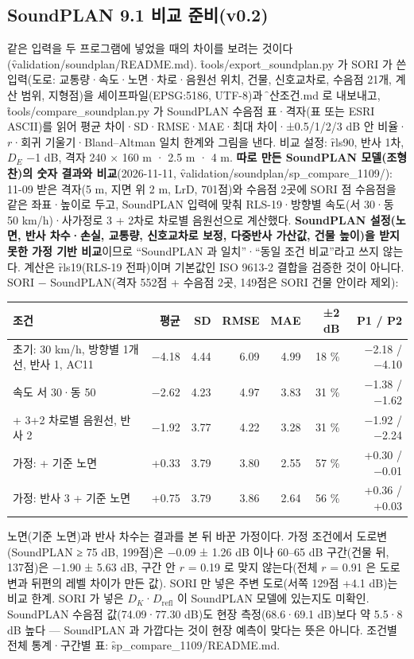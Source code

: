 \documentclass[10.5pt,a4paper]{article}
\begin{document}
\subsection{SoundPLAN 9.1 비교 준비(v0.2)}
같은 입력을 두 프로그램에 넣었을 때의 차이를 보려는 것이다(\f{validation/soundplan/README.md}). \f{tools/export\_soundplan.py} 가 SORI 가 쓴 입력(도로: 교통량·속도·노면·차로·음원선 위치, 건물, 신호교차로, 수음점 21개, 계산 범위, 지형점)을 셰이프파일(EPSG:5186, UTF-8)과 \f{계산조건.md} 로 내보내고, \f{tools/compare\_soundplan.py} 가 SoundPLAN 수음점 표·격자(표 또는 ESRI ASCII)를 읽어 평균 차이·SD·RMSE·MAE·최대 차이·±0.5/1/2/3 dB 안 비율·$r$·회귀 기울기·Bland–Altman 일치 한계와 그림을 낸다. 비교 설정: \f{rls90}, 반사 1차, $D_E$ −1 dB, 격자 240 × 160 m · 2.5 m · 4 m. \textbf{따로 만든 SoundPLAN 모델(조형찬)의 숫자 결과와 비교}(2026-11-11, \f{validation/soundplan/sp\_compare\_1109/}): 11-09 받은 격자(5 m, 지면 위 2 m, LrD, 701점)와 수음점 2곳에 SORI 점 수음점을 같은 좌표·높이로 두고, SoundPLAN 입력에 맞춰 RLS-19·방향별 속도(서 30·동 50 km/h)·사가정로 3 + 2차로 차로별 음원선으로 계산했다. \textbf{SoundPLAN 설정(노면, 반사 차수·손실, 교통량, 신호교차로 보정, 다중반사 가산값, 건물 높이)을 받지 못한 가정 기반 비교}이므로 ``SoundPLAN 과 일치''·``동일 조건 비교''라고 쓰지 않는다. 계산은 \f{rls19}(RLS-19 전파)이며 기본값인 ISO 9613-2 결합을 검증한 것이 아니다. SORI − SoundPLAN(격자 552점 + 수음점 2곳, 149점은 SORI 건물 안이라 제외):

\begin{center}\small\begin{tabular}{lrrrrrr}
\toprule
조건 & 평균 & SD & RMSE & MAE & ±2 dB & P1 / P2 \\ \midrule
초기: 30 km/h, 방향별 1개선, 반사 1, AC11 & −4.18 & 4.44 & 6.09 & 4.99 & 18 \% & −2.18 / −4.10 \\
속도 서 30·동 50 & −2.62 & 4.23 & 4.97 & 3.83 & 31 \% & −1.38 / −1.62 \\
+ 3+2 차로별 음원선, 반사 2 & −1.92 & 3.77 & 4.22 & 3.28 & 31 \% & −1.92 / −2.24 \\
가정: + 기준 노면 & +0.33 & 3.79 & 3.80 & 2.55 & 57 \% & +0.30 / −0.01 \\
가정: 반사 3 + 기준 노면 & +0.75 & 3.79 & 3.86 & 2.64 & 56 \% & +0.36 / +0.03 \\
\bottomrule
\end{tabular}\end{center}

노면(기준 노면)과 반사 차수는 결과를 본 뒤 바꾼 가정이다. 가정 조건에서 도로변(SoundPLAN ≥ 75 dB, 199점)은 −0.09 ± 1.26 dB 이나 60–65 dB 구간(건물 뒤, 137점)은 −1.90 ± 5.63 dB, 구간 안 $r$ = 0.19 로 맞지 않는다(전체 $r$ = 0.91 은 도로변과 뒤편의 레벨 차이가 만든 값). SORI 만 넣은 주변 도로(서쪽 129점 +4.1 dB)는 비교 한계. SORI 가 넣은 $D_K$·$D_\mathrm{refl}$ 이 SoundPLAN 모델에 있는지도 미확인. SoundPLAN 수음점 값(74.09·77.30 dB)도 현장 측정(68.6·69.1 dB)보다 약 5.5·8 dB 높다 — SoundPLAN 과 가깝다는 것이 현장 예측이 맞다는 뜻은 아니다. 조건별 전체 통계·구간별 표: \f{sp\_compare\_1109/README.md}.
\end{document}
